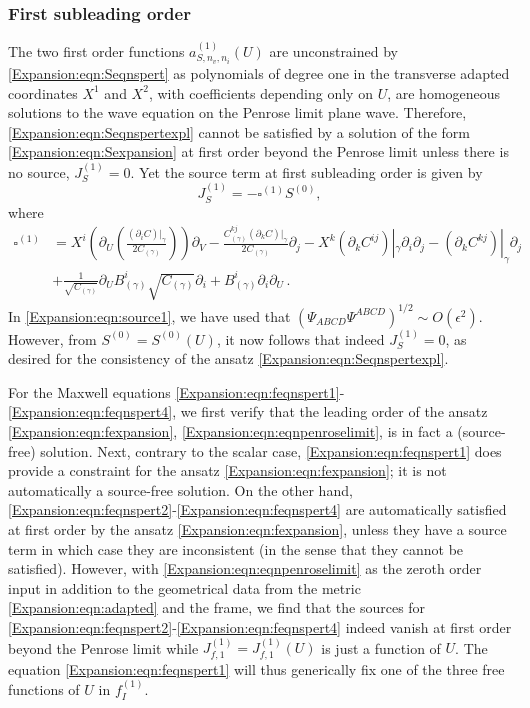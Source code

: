 \subsubsection*{First subleading order} The two first order functions $a^{(1)}_{S,n_v, n_i}(U)$ are unconstrained by \eqref{Expansion:eqn:Seqnspert} as polynomials of degree one in the transverse adapted coordinates $X^1$ and $X^2$, with coefficients depending only on $U$, are homogeneous solutions to the wave equation on the Penrose limit plane wave. Therefore, \eqref{Expansion:eqn:Seqnspertexpl} cannot be satisfied by a solution of the form \eqref{Expansion:eqn:Sexpansion} at first order beyond the Penrose limit unless there is no source, $J_S^{(1)} = 0$. Yet the source term at first subleading order is given by
\begin{equation}\label{Expansion:eqn:source1}
J_S^{(1)} =  -\square^{(1)}S^{(0)},
\end{equation}
where
\begin{equation}
\begin{aligned}
\square^{(1)}  &=  X^i\left(\partial_U   \left(\frac{\left(\partial_i C\right)|_{\gamma}}{2C_{(\gamma)}}\right)\right)  \partial_V -\frac{C^{kj}_{(\gamma)} \left(\partial_k C\right)|_{\gamma}}{2C_{(\gamma)}}  \partial_j -   X^k (\partial_k C^{ij})|_{\gamma}\partial_i\partial_j   -   (\partial_k C^{kj})|_{\gamma}\partial_j  \\
&+\frac{1}{\sqrt{C_{(\gamma)}}}\partial_U B^i_{(\gamma)} \sqrt{C_{(\gamma)}} \partial_i + B_{(\gamma)}^i \partial_i  \partial_U \, .
\end{aligned}
\end{equation}
In \eqref{Expansion:eqn:source1}, we have used that $\left(\Psi_{ABCD} \Psi^{ABCD}\right)^{1/2} \sim O(\epsilon^2)$. However, from $S^{(0)} = S^{(0)}(U)$, it now follows that indeed $J_S^{(1)} = 0$, as desired for the consistency of the ansatz \eqref{Expansion:eqn:Seqnspertexpl}.

For the Maxwell equations \eqref{Expansion:eqn:feqnspert1}-\eqref{Expansion:eqn:feqnspert4}, we first verify that
the leading order of the ansatz \eqref{Expansion:eqn:fexpansion}, \eqref{Expansion:eqn:eqnpenroselimit}, is in fact
a (source-free) solution. Next, contrary to the scalar case, \eqref{Expansion:eqn:feqnspert1} does provide a
constraint for the ansatz \eqref{Expansion:eqn:fexpansion}; it is not automatically a source-free solution. On the
other hand,   \eqref{Expansion:eqn:feqnspert2}-\eqref{Expansion:eqn:feqnspert4} are automatically satisfied at
first order by the ansatz \eqref{Expansion:eqn:fexpansion}, unless they have a source term in which case they are
inconsistent (in the sense that they cannot be satisfied). However, with \eqref{Expansion:eqn:eqnpenroselimit} as
the zeroth order input in addition to the geometrical data from the metric \eqref{Expansion:eqn:adapted} and the
frame, we find that the sources for \eqref{Expansion:eqn:feqnspert2}-\eqref{Expansion:eqn:feqnspert4} indeed vanish
at first order beyond the Penrose limit while $J^{(1)}_{f,1} = J^{(1)}_{f,1}(U)$ is just a function of $U$. The
equation \eqref{Expansion:eqn:feqnspert1} will thus generically fix one of the three free functions of $U$ in
$f^{(1)}_I$.


